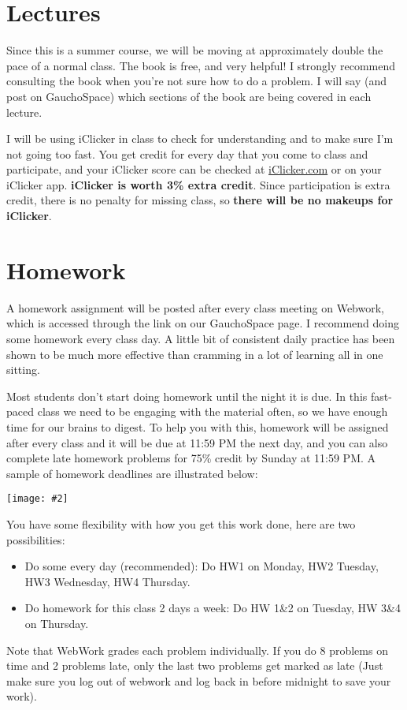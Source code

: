 \documentclass[11pt,letterpaper]{article}
\newcommand{\jpg}[2]{\begin{center}\texttt{[image: \#2]}\end{center}} %
\begin{document}
\section*{Lectures}
Since this is a summer course, we will be moving at approximately double the pace of a normal class. The book is free, and very helpful! I strongly recommend consulting the book when you're not sure how to do a problem. I will say (and post on GauchoSpace) which sections of the book are being covered in each lecture. 

I will be using iClicker in class to check for understanding and to make sure I'm not going too fast. You get credit for every day that you come to class and participate, and your iClicker score can be checked at \url{iClicker.com} or on your iClicker app. \textbf{iClicker is worth 3\% extra credit}. Since participation is extra credit, there is no penalty for missing class, so \textbf{there will be no makeups for iClicker}. 

\section*{Homework}
A homework assignment will be posted after every class meeting on Webwork, which is accessed through the link on our GauchoSpace page. I recommend doing some homework every class day. A little bit of consistent daily practice has been shown to be much more effective than cramming in a lot of learning all in one sitting.

Most students don't start doing homework until the night it is due. In this fast-paced class we need to be engaging with the material often, so we have enough time for our brains to digest. To help you with this, homework will be assigned after every class and it will be due at 11:59 PM the next day, and you can also complete late homework problems for 75\% credit by Sunday at 11:59 PM. A sample of homework deadlines are illustrated below:
\jpg{width=0.8\textwidth}{homework_deadlines}

You have some flexibility with how you get this work done, here are two possibilities:
\begin{itemize}
\item Do some every day (recommended): Do HW1 on Monday, HW2 Tuesday, HW3 Wednesday, HW4 Thursday.
\item Do homework for this class 2 days a week: Do HW 1\&2 on Tuesday, HW 3\&4 on Thursday.
\end{itemize}

Note that WebWork grades each problem individually. If you do 8 problems on time and 2 problems late, only the last two problems get marked as late (Just make sure you log out of webwork and log back in before midnight to save your work).
\end{document}
